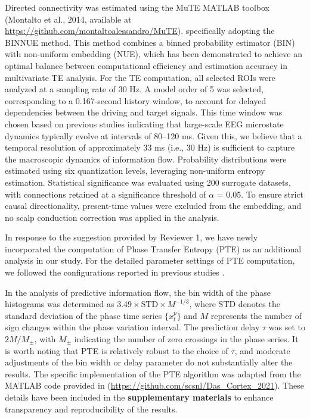 \documentclass[12pt,technote,onecolumn]{IEEEtran}
\begin{document}
Directed connectivity was estimated using the MuTE MATLAB toolbox (Montalto et al., 2014\cite{montalto2014mute}, available at \url{https://github.com/montaltoalessandro/MuTE}). specifically adopting the BINNUE method. This method combines a binned probability estimator (BIN) with non-uniform embedding (NUE), which has been demonstrated to achieve an optimal balance between computational efficiency and estimation accuracy in multivariate TE analysis. For the TE computation, all selected ROIs were analyzed at a sampling rate of 30 Hz. A model order of 5 was selected, corresponding to a 0.167-second history window, to account for delayed dependencies between the driving and target signals. This time window was chosen based on previous studies indicating that large-scale EEG microstate dynamics typically evolve at intervals of 80–120 ms\cite{khanna2015microstates}. Given this, we believe that a temporal resolution of approximately 33 ms (i.e., 30 Hz) is sufficient to capture the macroscopic dynamics of information flow. Probability distributions were estimated using six quantization levels, leveraging non-uniform entropy estimation. Statistical significance was evaluated using 200 surrogate datasets, with connections retained at a significance threshold of  $\alpha$ = 0.05. To ensure strict causal directionality, present-time values were excluded from the embedding, and no scalp conduction correction was applied in the analysis.

In response to the suggestion provided by Reviewer 1, we have newly incorporated the computation of Phase Transfer Entropy (PTE) as an additional analysis in our study. For the detailed parameter settings of PTE computation, we followed the configurations reported in previous studies \nocite{das2020spatiotemporal, das2022electrophysiological, das2022replicable,das2022causal,das2024frequency}. 

In the analysis of predictive information flow, the bin width of the phase histograms was determined as $3.49 \times \mathrm{STD} \times M^{-1/3}$, where $\mathrm{STD}$ denotes the standard deviation of the phase time series $\{x_t^p\}$ and $M$ represents the number of sign changes within the phase variation interval. The prediction delay $\tau$ was set to $2M/M_\pm$, with $M_\pm$ indicating the number of zero crossings in the phase series. It is worth noting that PTE is relatively robust to the choice of $\tau$, and moderate adjustments of the bin width or delay parameter do not substantially alter the results. The specific implementation of the PTE algorithm was adapted from the MATLAB code provided in \cite{das2022causal} (\url{https://github.com/scsnl/Das_Cortex_2021}). These details have been included in the \textbf{supplementary materials} to enhance transparency and reproducibility of the results.
\end{document}
